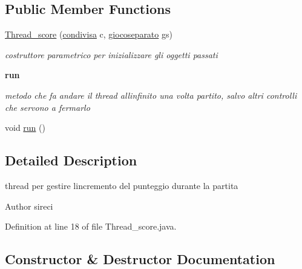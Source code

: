 \subsection*{Public Member Functions}
\begin{DoxyCompactItemize}
\item 
\hyperlink{classcargame_1_1_thread__score_afc8fa6c8f4294b6b6f3f5d7563acc926}{Thread\+\_\+score} (\hyperlink{classcargame_1_1condivisa}{condivisa} c, \hyperlink{classcargame_1_1giocoseparato}{giocoseparato} gs)
\begin{DoxyCompactList}\small\item\em costruttore parametrico per inizializzare gli oggetti passati \end{DoxyCompactList}\end{DoxyCompactItemize}
\begin{Indent}\textbf{ run}\par
{\em metodo che fa andare il thread all\textquotesingle{}infinito una volta partito, salvo altri controlli che servono a fermarlo }\begin{DoxyCompactItemize}
\item 
void \hyperlink{classcargame_1_1_thread__score_a13a43e6d814de94978c515cb084873b1}{run} ()
\end{DoxyCompactItemize}
\end{Indent}


\subsection{Detailed Description}
thread per gestire l\textquotesingle{}incremento del punteggio durante la partita 

\begin{DoxyAuthor}{Author}
sireci 
\end{DoxyAuthor}


Definition at line 18 of file Thread\+\_\+score.\+java.



\subsection{Constructor \& Destructor Documentation}
\mbox{\label{classcargame_1_1_thread__score_afc8fa6c8f4294b6b6f3f5d7563acc926}} 
